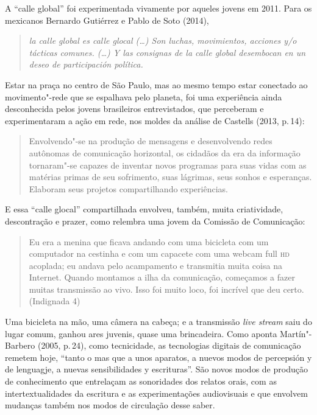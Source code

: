 A ``calle global'' foi experimentada vivamente por aqueles jovens em
2011. Para os mexicanos Bernardo Gutiérrez e Pablo de Soto (2014),

\begin{quote}
\emph{la calle global es calle glocal (\ldots{}) Son luchas, movimientos,
acciones y/o tácticas comunes. (\ldots{}) Y las consignas de la calle global
desembocan en un deseo de participación política. }
\end{quote}

Estar na praça no centro de São Paulo, mas ao mesmo tempo estar
conectado ao movimento"-rede que se espalhava pelo planeta, foi uma
experiência ainda desconhecida pelos jovens brasileiros
entrevistados, que perceberam e experimentaram a ação em rede, nos
moldes da análise de Castells (2013, p.\,14):

\begin{quote}
Envolvendo"-se na produção de mensagens e desenvolvendo redes autônomas
de comunicação horizontal, os cidadãos da era da informação tornaram"-se
capazes de inventar novos programas para suas vidas com as matérias
primas de seu sofrimento, suas lágrimas, seus sonhos e esperanças.
Elaboram seus projetos compartilhando experiências.
\end{quote}

E essa ``calle glocal'' compartilhada envolveu, também, muita
criatividade, descontração e prazer, como relembra uma jovem da Comissão
de Comunicação:

\begin{quote}
Eu era a menina que ficava andando com uma bicicleta com um
computador na cestinha e com um capacete com uma webcam full \textsc{hd}
acoplada; eu andava pelo acampamento e transmitia muita coisa na
Internet. Quando montamos a ilha da comunicação, começamos a fazer
muitas transmissão ao vivo. Isso foi muito loco, foi incrível que deu
certo. (Indignada 4)
\end{quote}

Uma bicicleta na mão, uma câmera na cabeça; e a transmissão \emph{live
stream} saiu do lugar comum, ganhou ares juvenis, quase uma brincadeira.
Como aponta Martín"-Barbero (2005, p.\,24), como tecnicidade, as
tecnologias digitais de comunicação remetem hoje, ``tanto o mas que a
unos aparatos, a nuevos modos de percepsión y de lenguagje, a nuevas
sensibilidades y escrituras''. São novos modos de produção de
conhecimento que entrelaçam as sonoridades dos relatos orais, com as
intertextualidades da escritura e as experimentações audiovisuais e que
envolvem mudanças também nos modos de circulação desse saber.

